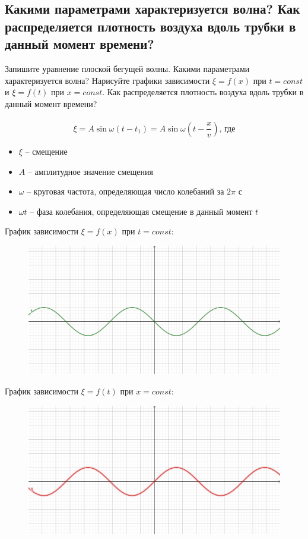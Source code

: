 \documentclass[otchet]{SCWorks}
\begin{document}
\subsection{Какими параметрами характеризуется волна? Как распределяется плотность воздуха вдоль трубки в данный момент времени?}
Запишите уравнение плоской бегущей волны. Какими параметрами характеризуется волна? Нарисуйте графики зависимости $\xi = f(x)$ при $t = const$ и $\xi = f(t)$ при $x = const$. Как распределяется плотность воздуха вдоль трубки в данный момент времени? \\
\\
\begin{equation*}
    \xi = A\sin{\omega(t-t_1)} = A\sin{\omega(t-\frac x v)}\text{, где}
\end{equation*}
\begin{itemize}
    \item $\xi$ -- смещение
    \item $A$ -- амплитудное значение смещения
    \item $\omega$ -- круговая частота, определяющая число колебаний за $2\pi$ с
    \item $\omega t$ -- фаза колебания, определяющая смещение в данный момент $t$
\end{itemize}
\newpage
График зависимости $\xi = f(x)$ при $t = const$:
\begin{figure}[h!]
    \includegraphics[width=\textwidth]{240312_physics_13.1_1.png}
\end{figure}

График зависимости $\xi = f(t)$ при $x = const$:
\begin{figure}[h!]
    \includegraphics[width=\textwidth]{240312_physics_13.1_2.png}
\end{figure}
\end{document}
